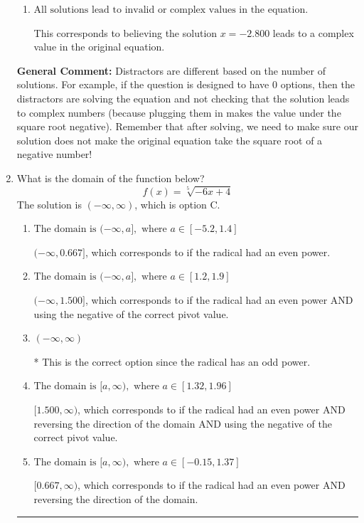\documentclass{extbook}[14pt]
\newcommand{\litem}[1]{\item #1

\rule{\textwidth}{0.4pt}}
\begin{document}
\begin{enumerate}
{\begin{enumerate}[label=\Alph*.]
$x = -0.400$, which corresponds to squaring each square root separately and assigning the negative to the third term.
\item \( \text{All solutions lead to invalid or complex values in the equation.} \)

This corresponds to believing the solution $x = -2.800$ leads to a complex value in the original equation.
\end{enumerate}

\textbf{General Comment:} Distractors are different based on the number of solutions. For example, if the question is designed to have 0 options, then the distractors are solving the equation and not checking that the solution leads to complex numbers (because plugging them in makes the value under the square root negative). Remember that after solving, we need to make sure our solution does not make the original equation take the square root of a negative number!
}
\litem{
What is the domain of the function below?
\[ f(x) = \sqrt[5]{-6 x + 4} \]The solution is \( (-\infty, \infty) \), which is option C.\begin{enumerate}[label=\Alph*.]
\item \( \text{The domain is } (-\infty, a], \text{   where } a \in [-5.2, 1.4] \)

$(-\infty, 0.667]$, which corresponds to if the radical had an even power.
\item \( \text{The domain is } (-\infty, a], \text{   where } a \in [1.2, 1.9] \)

$(-\infty, 1.500]$, which corresponds to if the radical had an even power AND using the negative of the correct pivot value.
\item \( (-\infty, \infty) \)

* This is the correct option since the radical has an odd power.
\item \( \text{The domain is } [a, \infty), \text{   where } a \in [1.32, 1.96] \)

$[1.500, \infty)$, which corresponds to if the radical had an even power AND reversing the direction of the domain AND using the negative of the correct pivot value.
\item \( \text{The domain is } [a, \infty), \text{   where } a \in [-0.15, 1.37] \)

$[0.667, \infty)$, which corresponds to if the radical had an even power AND reversing the direction of the domain.
\end{enumerate}

}
\end{enumerate}
\end{document}
